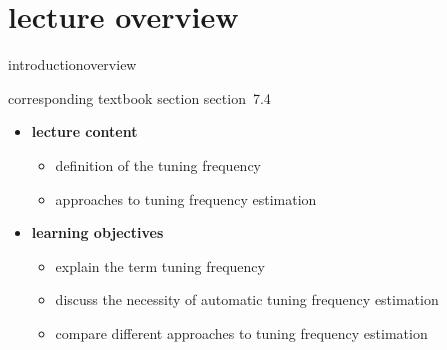 


\subtitle{module 7.4: tuning frequency estimation}


	

    \section[overview]{lecture overview}
        \begin{frame}{introduction}{overview}
            \begin{block}{corresponding textbook section}
                    section~7.4
            \end{block}

            \begin{itemize}
                \item   \textbf{lecture content}
                    \begin{itemize}
                        \item   definition of the tuning frequency
                        \item   approaches to tuning frequency estimation
                    \end{itemize}
                \bigskip
                \item<2->   \textbf{learning objectives}
                    \begin{itemize}
                        \item   explain the term tuning frequency
                        \item   discuss the necessity of automatic tuning frequency estimation
                        \item   compare different approaches to tuning frequency estimation
                    \end{itemize}
            \end{itemize}
        \end{frame}
        
